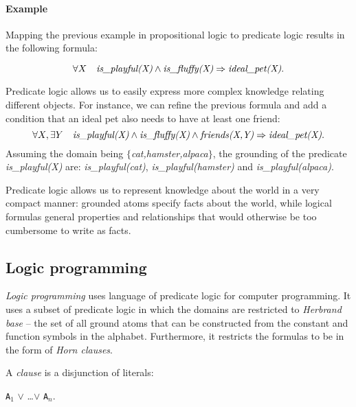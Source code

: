 \paragraph{Example} Mapping the previous example in propositional logic to predicate logic results in the following formula: 

$$\forall X \quad \text{\textit{is\_playful(X)}} \wedge \text{\textit{is\_fluffy(X)}} \Rightarrow \text{\textit{ideal\_pet(X)}}. $$

 Predicate logic allows us to easily express more complex knowledge relating different objects.
 For instance, we can refine the previous formula and add a condition that an ideal pet also needs to have at least one friend: 
 $$\forall X, \exists Y \quad \text{\textit{is\_playful(X)}} \wedge \text{\textit{is\_fluffy(X)}} \wedge \text{\textit{friends(X,Y)}} \Rightarrow \text{\textit{ideal\_pet(X)}}. $$
 Assuming the domain being $\{$\textit{cat,hamster,alpaca}$\}$, the grounding of the predicate \textit{is\_playful(X)} are: \textit{is\_playful(cat)}, \textit{is\_playful(hamster)} and \textit{is\_playful(alpaca)}.
 
 
 
 
 Predicate logic allows us to represent knowledge about the world in a very compact manner: grounded atoms specify facts about the world, while logical formulas general properties and relationships that would otherwise be too cumbersome to write as facts.
 
 
 
 


 



\subsection{Logic programming}


\textit{Logic programming} uses language of predicate logic for computer programming.
It uses a subset of predicate logic in which the domains are restricted to \textit{Herbrand base} -- the set of all ground atoms that can be constructed from the constant and function symbols in the alphabet.
Furthermore, it restricts the formulas to be in the form of \textit{Horn clauses}.


A \textit{clause} is a disjunction of literals:

\begin{center}
	\texttt{A}$_1$  $\vee$ \ldots $\vee$ \texttt{A}$_n$.
\end{center}


